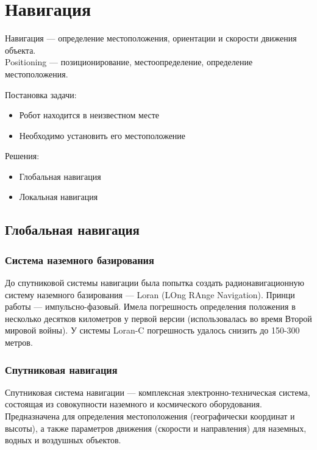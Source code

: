 \documentclass{article}
\begin{document}
\begin{sloppypar}
    \section{Навигация}

    Навигация — определение местоположения, ориентации и скорости движения объекта. \\
    Positioning — позиционирование, местоопределение, определение местоположения.

    Постановка задачи:
    \begin{itemize}
        \item Робот находится в неизвестном месте
        \item Необходимо установить его местоположение
    \end{itemize}

    Решения:
    \begin{itemize}
        \item Глобальная навигация
        \item Локальная навигация
    \end{itemize}

    \subsection{Глобальная навигация}

    \subsubsection{Система наземного базирования}
    До спутниковой системы навигации была попытка создать радионавигационную систему наземного базирования — Loran (LOng RAnge Navigation). Принци работы — импульсно-фазовый. Имела погрешность определения положения в несколько десятков километров у первой версии (использовалась во время Второй мировой войны). У системы Loran-C погрешность удалось снизить до 150-300 метров.

    \subsubsection{Спутниковая навигация}

    Спутниковая система навигации — комплексная электронно-техническая система, состоящая из совокупности наземного и космического оборудования. Предназначена для определения местоположения (географически координат и высоты), а также параметров движения (скорости и направления) для наземных, водных и воздушных объектов.


\end{sloppypar}
\end{document}
